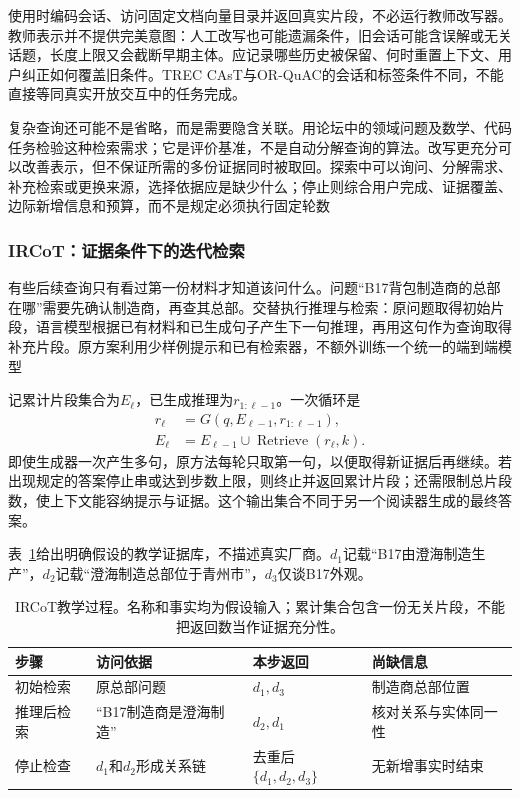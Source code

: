 使用时编码会话、访问固定文档向量目录并返回真实片段，不必运行教师改写器。教师表示并不提供完美意图：人工改写也可能遗漏条件，旧会话可能含误解或无关话题，长度上限又会截断早期主体。应记录哪些历史被保留、何时重置上下文、用户纠正如何覆盖旧条件。TREC CAsT与OR-QuAC的会话和标签条件不同，不能直接等同真实开放交互中的任务完成。

复杂查询还可能不是省略，而是需要隐含关联。用论坛中的领域问题及数学、代码任务检验这种检索需求；它是评价基准，不是自动分解查询的算法。改写更充分可以改善表示，但不保证所需的多份证据同时被取回。探索中可以询问、分解需求、补充检索或更换来源，选择依据应是缺少什么；停止则综合用户完成、证据覆盖、边际新增信息和预算，而不是规定必须执行固定轮数

\Needspace{100mm}
\subsubsection{IRCoT：证据条件下的迭代检索}
\label{sec:rs-search-ircot}

有些后续查询只有看过第一份材料才知道该问什么。问题“B17背包制造商的总部在哪”需要先确认制造商，再查其总部。交替执行推理与检索：原问题取得初始片段，语言模型根据已有材料和已生成句子产生下一句推理，再用这句作为查询取得补充片段。原方案利用少样例提示和已有检索器，不额外训练一个统一的端到端模型

记累计片段集合为$E_\ell$，已生成推理为$r_{1:\ell-1}$。一次循环是
\begin{equation}
 \begin{split}
 r_\ell&=G(q,E_{\ell-1},r_{1:\ell-1}),\\
 E_\ell&=E_{\ell-1}\cup\operatorname{Retrieve}(r_\ell,k).
 \end{split}
 \label{eq:rs-search-ircot}
\end{equation}
即使生成器一次产生多句，原方法每轮只取第一句，以便取得新证据后再继续。若出现规定的答案停止串或达到步数上限，则终止并返回累计片段；还需限制总片段数，使上下文能容纳提示与证据。这个输出集合不同于另一个阅读器生成的最终答案。

表~\ref{tab:rs-search-evidence-steps}给出明确假设的教学证据库，不描述真实厂商。$d_1$记载“B17由澄海制造生产”，$d_2$记载“澄海制造总部位于青州市”，$d_3$仅谈B17外观。
\begin{table}[htbp]
 \centering
 \begin{tabularx}{\linewidth}{lXXX}
  \toprule
  步骤 & 访问依据 & 本步返回 & 尚缺信息 \\
  \midrule
  初始检索 & 原总部问题 & $d_1,d_3$ & 制造商总部位置 \\
  推理后检索 & “B17制造商是澄海制造” & $d_2,d_1$ & 核对关系与实体同一性 \\
  停止检查 & $d_1$和$d_2$形成关系链 & 去重后$\{d_1,d_2,d_3\}$ & 无新增事实时结束 \\
  \bottomrule
 \end{tabularx}
 \caption{IRCoT教学过程。名称和事实均为假设输入；累计集合包含一份无关片段，不能把返回数当作证据充分性。}
 \label{tab:rs-search-evidence-steps}
\end{table}

